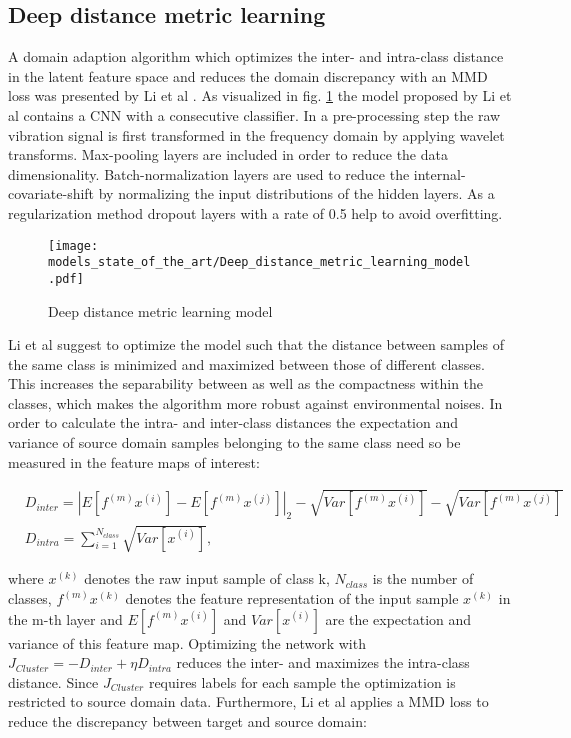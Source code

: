 \subsection{Deep distance metric learning}
A domain adaption algorithm which optimizes the inter- and intra-class distance in the latent feature space and reduces the domain discrepancy with an MMD loss was presented by Li et al \cite{Li2018}. As visualized in fig. \ref{fig:Deep_distance_metric_learning_model} the model proposed by Li et al contains a CNN with a consecutive classifier. In a pre-processing step the raw vibration signal is first transformed in the frequency domain by applying wavelet transforms. Max-pooling layers are included in order to reduce the data dimensionality. Batch-normalization layers are used to reduce the internal-covariate-shift by normalizing the input distributions of the hidden layers. As a regularization method dropout layers with a rate of 0.5 help to avoid overfitting. 

\begin{figure}[p]
  \centering
  \texttt{[image: models\_state\_of\_the\_art/Deep\_distance\_metric\_learning\_model.pdf]}
  \caption{Deep distance metric learning model \cite{Li2018}}
  \label{fig:Deep_distance_metric_learning_model}
\end{figure}

Li et al suggest to optimize the model such that the distance between samples of the same class is minimized and maximized between those of different classes. This increases the separability between as well as the compactness within the classes, which makes the algorithm more robust against environmental noises. In order to calculate the intra- and inter-class distances the expectation and variance of source domain samples belonging to the same class need so be measured in the feature maps of interest:

\begin{equation}
    \begin{aligned}
       &D_{inter} = |E[f^{(m)}x^{(i)}]-E[f^{(m)}x^{(j)}]|_{2}-\sqrt{Var[f^{(m)}x^{(i)}]}-\sqrt{Var[f^{(m)}x^{(j)}]}\\
       &D_{intra} = 
        \sum_{i=1}^{N_{class}} \sqrt{Var[x^{(i)}]},
    \end{aligned}
\end{equation}

where $x^{(k)}$ denotes the raw input sample of class k, $N_{class}$ is the number of classes, $f^{(m)}x^{(k)}$ denotes the feature representation of the input sample $x^{(k)}$ in the m-th layer and $E[f^{(m)}x^{(i)}]$ and $Var[x^{(i)}]$ are the  expectation and variance of this feature map. Optimizing the network with $J_{Cluster} = - D_{inter} + \eta D_{intra}$ reduces the inter- and maximizes the intra-class distance. Since $J_{Cluster}$  requires labels for each sample the optimization is restricted to source domain data. Furthermore, Li et al applies a MMD loss to reduce the discrepancy between target and source domain: 

